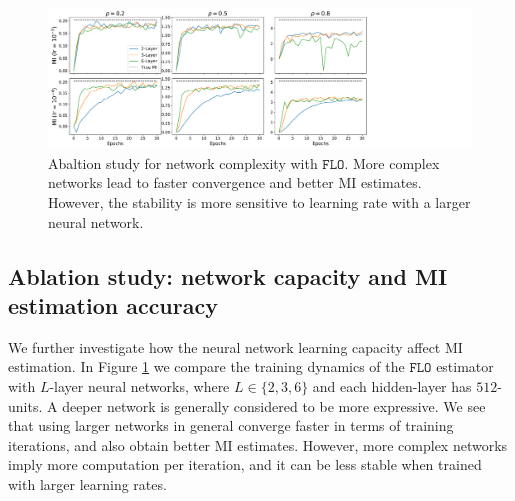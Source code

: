 \documentclass{article}
\theoremstyle{plain}
\theoremstyle{definition}
\theoremstyle{remark}
\newcommand{\FLO}{\texttt{FLO}}
\begin{document}
		
		\begin{figure}[t!]
			\begin{center}
				\includegraphics[trim=0 0 5.in 0, clip, width=1.\textwidth]{figures/toy/layercomp.pdf}
			\end{center}
			\vspace{-1.5em}
			\caption{Abaltion study for network complexity with $\FLO$. More complex networks lead to faster convergence and better MI estimates. However, the stability is more sensitive to learning rate with a larger neural network. \label{fig:layer_cmp}}
			\vspace{-1.5em}
		\end{figure}
		
		
		
		
		\subsection{Ablation study: network capacity and MI estimation accuracy} 
		\label{sec:capacity}
		
		We further investigate how the neural network learning capacity affect MI estimation. In Figure \ref{fig:layer_cmp} we compare the training dynamics of the $\FLO$ estimator with $L$-layer neural networks, where $L \in \{2,3,6\}$ and each hidden-layer has $512$-units. A deeper network is generally considered to be more expressive. We see that using larger networks in general converge faster in terms of training iterations, and also obtain better MI estimates. However, more complex networks imply more computation per iteration, and it can be less stable when trained with larger learning rates. 
		
\end{document}
